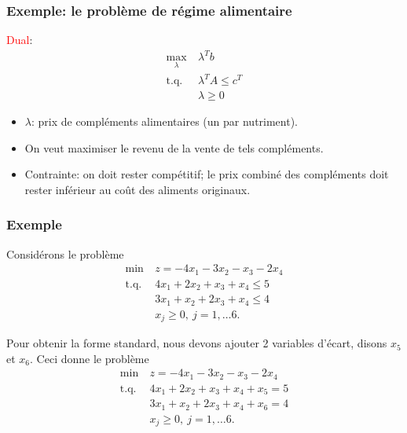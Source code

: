 \documentclass[usepdftitle=false]{beamer}
\begin{document}
\begin{frame}
\frametitle{Exemple: le problème de régime alimentaire}

\textcolor{red}{Dual}:
\begin{align*}
\max_{\lambda} \ & \lambda^T b \\
\mbox{t.q. } & \lambda^T A \leq c^T \\
& \lambda \geq 0
\end{align*}

\begin{itemize}
\item 
$\lambda$: prix de compléments alimentaires (un par nutriment).
\item
On veut maximiser le revenu de la vente de tels compléments.
\item 
Contrainte: on doit rester compétitif; le prix combiné des compléments doit rester inférieur au coût des aliments originaux.
\end{itemize}

\end{frame}

\begin{frame}
\frametitle{Exemple}

Considérons le problème
\begin{align*}
\min\ &z = -4x_1 - 3x_2 -x_3 -2x_4 \\
\mbox{t.q. } & 4x_1 + 2x_2 + x_3 + x_4 \leq 5 \\
& 3x_1 + x_2 + 2x_3 + x_4 \leq 4 \\
& x_j \geq 0,\ j = 1,\ldots 6.
\end{align*}

Pour obtenir la forme standard, nous devons ajouter 2 variables d'écart, disons $x_5$ et $x_6$. Ceci donne le problème
\begin{align*}
\min\ &z = -4x_1 - 3x_2 -x_3 -2x_4 \\
\mbox{t.q. } & 4x_1 + 2x_2 + x_3 + x_4 + x_5 = 5 \\
& 3x_1 + x_2 + 2x_3 + x_4 + x_6 = 4 \\
& x_j \geq 0,\ j = 1,\ldots 6.
\end{align*}

\end{frame}
\end{document}
